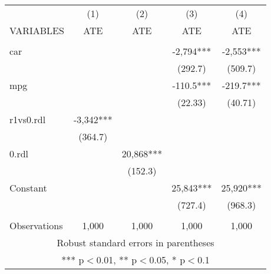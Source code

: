 \documentclass[]{article}
\begin{document}
\begin{tabular}{lcccc} \hline
 & (1) & (2) & (3) & (4) \\
VARIABLES & ATE & ATE & ATE & ATE \\ \hline
 &  &  &  &  \\
car &  &  & -2,794*** & -2,553*** \\
 &  &  & (292.7) & (509.7) \\
mpg &  &  & -110.5*** & -219.7*** \\
 &  &  & (22.33) & (40.71) \\
r1vs0.rdl & -3,342*** &  &  &  \\
 & (364.7) &  &  &  \\
0.rdl &  & 20,868*** &  &  \\
 &  & (152.3) &  &  \\
Constant &  &  & 25,843*** & 25,920*** \\
 &  &  & (727.4) & (968.3) \\
 &  &  &  &  \\
 Observations & 1,000 & 1,000 & 1,000 & 1,000 \\ \hline
\multicolumn{5}{c}{ Robust standard errors in parentheses} \\
\multicolumn{5}{c}{ *** p$<$0.01, ** p$<$0.05, * p$<$0.1} \\
\end{tabular}
\end{document}
